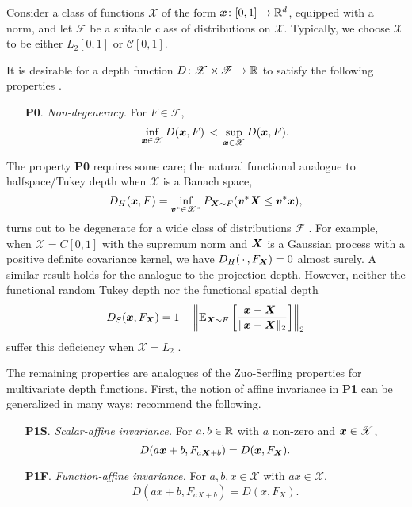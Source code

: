 Consider a class of functions $\mathscr{X}$ of the form $\bm{x}\colon [0, 1] \to
\mathbb{R}^d$, equipped with a norm, and let $\mathscr{F}$ be a suitable class of
distributions on $\mathscr{X}$.
Typically, we choose $\mathscr{X}$ to be either $L_2[0, 1]$ or $\mathcal{C}[0,
1]$.

It is desirable for a depth function $D\colon \mathscr{X} \times \mathscr{F}
\to \mathbb{R}$ to satisfy the following properties \parencite{gijbels-nagy-2017}.
\begin{enumerate}
    \item[\textbf{P0}.] \emph{Non-degeneracy.}
    For $F \in \mathscr{F}$,
    \begin{equation}
        \inf_{\bm{x} \in \mathscr{X}} D(\bm{x}, F) \,<\,
        \sup_{\bm{x} \in \mathscr{X}} D(\bm{x}, F).
    \end{equation}
\end{enumerate}

The property \textbf{P0} requires some care; the natural functional analogue
to halfspace/Tukey depth when $\mathscr{X}$ is a Banach space,
\begin{equation}
    D_H(\bm{x}, F) = \inf_{\bm{v}^* \in \mathscr{X}^*} P_{\bm{X} \sim F}(\bm{v}^*\bm{X} \leq \bm{v}^*\bm{x}),
\end{equation}
turns out to be degenerate for a wide class of distributions $\mathscr{F}$
\parencite{chakraborty-chaudhuri-2014a}.
For example, when $\mathscr{X} = C[0, 1]$ with the supremum norm and $\bm{X}$ is
a Gaussian process with a positive definite covariance kernel, we have
$D_H(\,\cdot\,, F_{\bm{X}}) = 0$ almost surely.
A similar result holds for the analogue to the projection depth.
However, neither the functional random Tukey depth nor the functional spatial
depth
\begin{equation}
    D_S(\bm{x}, F_{\bm{X}}) = 1 - \left\Vert \operatorname{\mathbb{E}}_{\bm{X} \sim F} \left[\frac{\bm{x} - \bm{X}\;\,}{\Vert \bm{x} - \bm{X} \Vert_2}\right] \right\Vert_2
\end{equation}
suffer this deficiency when $\mathscr{X} = L_2$
\parencite{albertos-reyes-2008a, gijbels-nagy-2017}.


The remaining properties are analogues of the Zuo-Serfling properties for
multivariate depth functions.
First, the  notion of affine invariance in \textbf{P1} can be generalized in
many ways; \textcite{gijbels-nagy-2017} recommend the following.

\begin{enumerate}
    \item[\textbf{P1S}.] \emph{Scalar-affine invariance.}
    For $a, b \in \mathbb{R}$ with $a$ non-zero and $\bm{x} \in \mathscr{X}$,
    \begin{equation}
        D(a\bm{x} + b, F_{a\bm{X} + b}) = D(\bm{x}, F_{\bm{X}}).
    \end{equation}

    \item[\textbf{P1F}.] \emph{Function-affine invariance.}
    For $a, b, x \in \mathscr{X}$ with $ax \in \mathscr{X}$,
    \begin{equation}
        D(ax + b, F_{aX + b}) = D(x, F_{X}).
    \end{equation}
\end{enumerate}


